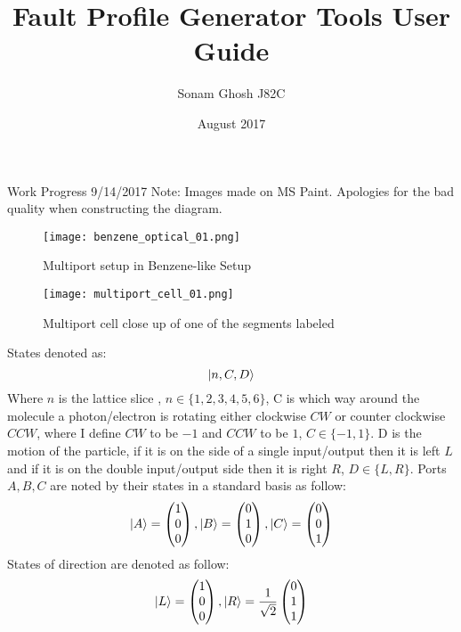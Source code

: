\documentclass{article}
\title{Fault Profile Generator Tools User Guide}
\author{Sonam Ghosh J82C}
\date{August 2017}
\begin{document}
Work Progress 9/14/2017 \newline
Note: Images made on MS Paint. Apologies for the bad quality when constructing the diagram. \newline
\begin{figure}[h]
    \centering
    \texttt{[image: benzene\_optical\_01.png]}
    \caption{Multiport setup in Benzene-like Setup}
    \label{fig:my_label}
\end{figure}

\begin{figure}[!h]
    \centering
    \texttt{[image: multiport\_cell\_01.png]}
    \caption{Multiport cell close up of one of the segments labeled}
    \label{fig:my_label}
\end{figure}

\newpage
States denoted as:
$$ \ket{n, C, D} $$
Where $n$ is the lattice slice , $n \in \{1,2,3,4,5,6\}$, C is which way around the molecule a photon/electron is rotating either clockwise $CW$ or counter clockwise $CCW$, where I define $CW$ to be $-1$ and $CCW$ to be $1$, $C \in \{-1, 1\}$. D is the motion of the particle, if it is on the side of a single input/output then it is left $L$ and if it is on the double input/output side then it is right $R$, $D \in \{L, R\}$. \newline
Ports $A, B, C$ are noted by their states in a standard basis as follow: 
$$ \ket{A} = \begin{pmatrix} 
1 \\
0 \\
0
\end{pmatrix} ,
 \ket{B} = \begin{pmatrix} 
0 \\
1 \\
0
\end{pmatrix} ,
 \ket{C} = \begin{pmatrix} 
0 \\
0 \\
1
\end{pmatrix} 
$$
States of direction are denoted as follow:
$$ \ket{L} =  \begin{pmatrix} 
1 \\
0 \\
0
\end{pmatrix} , 
\ket{R} = \frac{1}{\sqrt{2}}\begin{pmatrix}
0 \\
1 \\
1
\end{pmatrix}
$$
\end{document}

